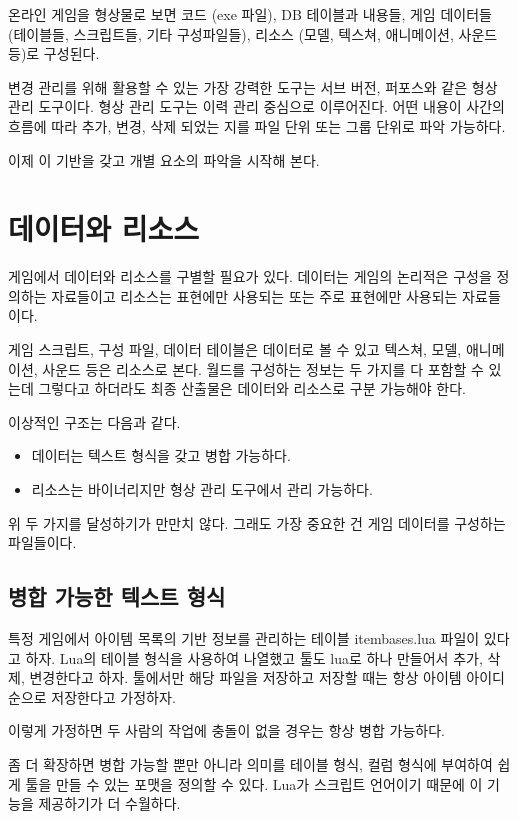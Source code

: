 \documentclass[chapter,kosection, 10.5pt, romanfixed, a4paper]{oblivoir}
\begin{document}
온라인 게임을 형상물로 보면 코드 (exe 파일), DB 테이블과 내용들, 게임 데이터들 (테이블들, 스크립트들, 기타 구성파일들), 
리소스 (모델, 텍스쳐, 애니메이션, 사운드 등)로 구성된다. 

변경 관리를 위해 활용할 수 있는 가장 강력한 도구는 서브 버전, 퍼포스와 같은 형상 관리 도구이다. 형상 관리 
도구는 이력 관리 중심으로 이루어진다. 어떤 내용이 사간의 흐름에 따라 추가, 변경, 삭제 되었는 지를 파일 단위 또는
그룹 단위로 파악 가능하다. 

이제 이 기반을 갖고 개별 요소의 파악을 시작해 본다. 

\section{데이터와 리소스}

게임에서 데이터와 리소스를 구별할 필요가 있다. 데이터는 게임의 논리적은 구성을 정의하는 자료들이고 
리소스는 표현에만 사용되는 또는 주로 표현에만 사용되는 자료들이다. 

게임 스크립트, 구성 파일, 데이터 테이블은 데이터로 볼 수 있고 텍스쳐, 모델, 애니메이션, 사운드 등은
리소스로 본다. 월드를 구성하는 정보는 두 가지를 다 포함할 수 있는데 그렇다고 하더라도 최종 산출물은
데이터와 리소스로 구분 가능해야 한다. 

이상적인 구조는 다음과 같다. 
\begin{itemize}
\item 데이터는 텍스트 형식을 갖고 병합 가능하다. 
\item 리소스는 바이너리지만 형상 관리 도구에서 관리 가능하다. 
\end{itemize}

위 두 가지를 달성하기가 만만치 않다. 그래도 가장 중요한 건 게임 데이터를 구성하는 파일들이다. 

\subsection{병합 가능한 텍스트 형식}

특정 게임에서 아이템 목록의 기반 정보를 관리하는 테이블 itembases.lua 파일이 있다고 하자. 
Lua의 테이블 형식을 사용하여 나열했고 툴도 lua로 하나 만들어서 추가, 삭제, 변경한다고 하자. 
툴에서만 해당 파일을 저장하고 저장할 때는 항상 아이템 아이디 순으로 저장한다고 가정하자. 

이렇게 가정하면 두 사람의 작업에 충돌이 없을 경우는 항상 병합 가능하다. 

좀 더 확장하면 병합 가능할 뿐만 아니라 의미를 테이블 형식, 컬럼 형식에 부여하여 쉽게 
툴을 만들 수 있는 포맷을 정의할 수 있다. Lua가 스크립트 언어이기 때문에 이 기능을 제공하기가 
더 수월하다. 
\end{document}

